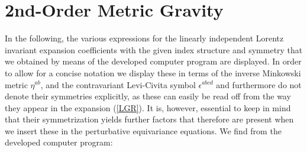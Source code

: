 \section{2nd-Order Metric Gravity}\label{AppGR}
In the following, the various expressions for the linearly independent Lorentz invariant expansion coefficients with the given index structure and symmetry that we obtained by means of the developed computer program are displayed. In order to allow for a concise notation we display these in terms of the inverse Minkowski metric $\eta^{ab}$, and the contravariant Levi-Civita symbol $\epsilon^{abcd}$ and furthermore do not denote their symmetries explicitly, as these can easily be read off from the way they appear in the expansion (\ref{LGR}). It is, however, essential to keep in mind that their symmetrization yields further factors that therefore are present when we insert these in the perturbative equivariance equations. We find from the developed computer program:\\

